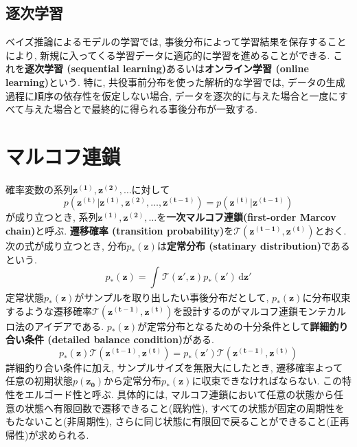 \documentclass[twocolumn]{jarticle}
\begin{document}
\subsection{逐次学習}
ベイズ推論によるモデルの学習では, 事後分布によって学習結果を保存することにより, 新規に入ってくる学習データに適応的に学習を進めることができる. これを{\bf 逐次学習 (sequential learning)}あるいは{\bf オンライン学習 (online learning)}という. 特に, 共役事前分布を使った解析的な学習では, データの生成過程に順序の依存性を仮定しない場合, データを逐次的に与えた場合と一度にすべて与えた場合とで最終的に得られる事後分布が一致する.

\section{マルコフ連鎖}
確率変数の系列${\bm {z^{(1)}, z^{(2)}}, \ldots}$に対して
\begin{equation}
  p(\bm {z^(t) | z^{(1)}, z^{(2)}, \ldots, z^{(t-1)}}) = p(\bm {z^{(t)} | z^{(t-1)}})
\end{equation}
が成り立つとき, 系列${\bm {z^{(1)}, z^{(2)}}, \ldots}$を{\bf 一次マルコフ連鎖(first-order Marcov chain)}と呼ぶ.
{\bf 遷移確率 (transition probability)}を${\mathcal{T} (\bm {z^{(t-1)}, z^{(t)}})}$とおく. 次の式が成り立つとき, 分布${p_\ast(\bm {z})}$は{\bf 定常分布 (statinary distribution)}であるという.
\begin{equation}
  p_\ast(\bm {z}) = \int_{}^{} \mathcal{T} (\bm {z', z})p_\ast(\bm {z'}) \,\mathrm{d}{\bm {z'}}
\end{equation}
定常状態${p_\ast(\bm {z})}$がサンプルを取り出したい事後分布だとして, ${p_\ast(\bm {z})}$に分布収束するような遷移確率${\mathcal{T} (\bm {z^{(t-1)}, z^{(t)}})}$を設計するのがマルコフ連鎖モンテカルロ法のアイデアである. ${p_\ast(\bm {z})}$が定常分布となるための十分条件として{\bf 詳細釣り合い条件 (detailed balance condition)}がある.
\begin{equation}
  p_\ast(\bm {z})\mathcal{T} (\bm {z^{(t-1)}, z^{(t)}}) =  p_\ast(\bm {z'})\mathcal{T} (\bm {z^{(t-1)}, z^{(t)}})
\end{equation}
詳細釣り合い条件に加え, サンプルサイズを無限大にしたとき, 遷移確率よって任意の初期状態${p(\bm {z_0})}$から定常分布${p_\ast(\bm {z})}$に収束できなければならない. この特性をエルゴード性と呼ぶ. 具体的には, マルコフ連鎖において任意の状態から任意の状態へ有限回数で遷移できること(既約性), すべての状態が固定の周期性をもたないこと(非周期性), さらに同じ状態に有限回で戻ることができること(正再帰性)が求められる.
\end{document}
